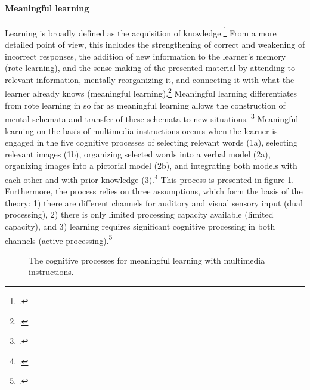 \paragraph{Meaningful learning} Learning is broadly defined as the acquisition of knowledge.\footcites[Cf.][p.226]{MayerRotemeaningfullearning2002} From a more detailed point of view, this includes the strengthening of correct and weakening of incorrect responses, the addition of new information to the learner's memory (rote learning), and the sense making of the presented material by attending to relevant information, mentally reorganizing it, and connecting it with what the learner already knows (meaningful learning).\footcites[Cf.][chapter 2, paragraph 5]{ClarkElearningscienceinstruction2016} Meaningful learning differentiates from rote learning in so far as meaningful learning allows the construction of mental schemata and transfer of these schemata to new situations.%
\footcites[Cf.][p.227]{MayerRotemeaningfullearning2002}[cf.][p.299]{SwellerCognitiveloadtheory1994} Meaningful learning on the basis of multimedia instructions occurs when the learner is engaged in the five cognitive processes of selecting relevant words (1a), selecting relevant images (1b), organizing selected words into a verbal model (2a), organizing images into a pictorial model (2b), and integrating both models with each other and with prior knowledge (3).\footcites[Cf.][p.111]{MayerCognitiveTheoryMultimedia1999}[cf.][p.35]{SordenCognitiveTheoryMultimedia}[cf.][p.43]{MayerNineWaysReduce2003} This process is presented in figure \ref{fig:CTML_process}. Furthermore, the process relies on three assumptions, which form the basis of the theory: 1) there are different channels for auditory and visual sensory input (dual processing), 2) there is only limited processing capacity available (limited capacity), and 3) learning requires significant cognitive processing in both channels (active processing).\footcites[Cf.][p.44]{MayerNineWaysReduce2003}

\begin{figure}
    \centering
    
    \caption[The cognitive processes for meaningful learning with multimedia instructions.]{The cognitive processes for meaningful learning with multimedia instructions.\footnotemark}
    \label{fig:CTML_process}
\end{figure}

